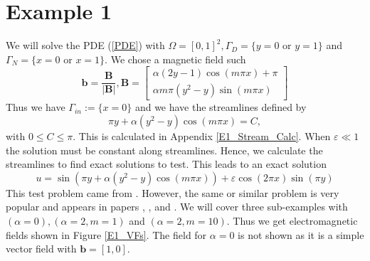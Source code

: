 \documentclass[12pt]{ociamthesis}
\begin{document}
\section{Example 1}
We will solve the PDE (\ref{PDE}) with $\Omega = [0,1]^2, \Gamma_D = \{y=0 \text{ or } y=1\}$ and $\Gamma_N = \{x=0 \text{ or } x=1\}$. We chose a magnetic field such
\begin{equation} \label{E1_b}
\mathbf{b} = \frac{\mathbf{B}}{|\mathbf{B}|}, 
\mathbf{B} = \left[ \begin{matrix}
\alpha(2y-1)\cos(m\pi x) + \pi\\
\alpha m \pi (y^2-y)\sin(m \pi x)
\end{matrix} \right]
\end{equation}
Thus we have $\Gamma_{in}:= \{x=0\}$ and we have the streamlines defined by 
\begin{equation}
\pi y + \alpha (y^2-y) \cos(m\pi x) = C,
\end{equation}
with $0 \leq C \leq \pi$. This is calculated in Appendix \ref{E1_Stream_Calc}. When $\varepsilon \ll 1$ the solution must be constant along streamlines. Hence, we calculate the streamlines to find exact solutions to test. This leads to an exact solution 
\begin{equation} \label{E1_u}
u = \sin(\pi y + \alpha (y^2-y) \cos(m\pi x)) + \varepsilon \cos(2 \pi x) \sin(\pi y)
\end{equation}
This test problem came from \cite{DN}. However, the same or similar problem is very popular and appears in papers \cite{LINE_INT}, \cite{AP}, \cite{MMAP} and \cite{STAB}. We will cover three sub-examples with $(\alpha=0),(\alpha=2,m=1)$ and $(\alpha = 2, m=10)$. Thus we get electromagnetic fields shown in Figure \ref{E1_VFs}. The field for $\alpha = 0$ is not shown as it is a simple vector field with $\mathbf{b}= [1, 0]$.
\end{document}
